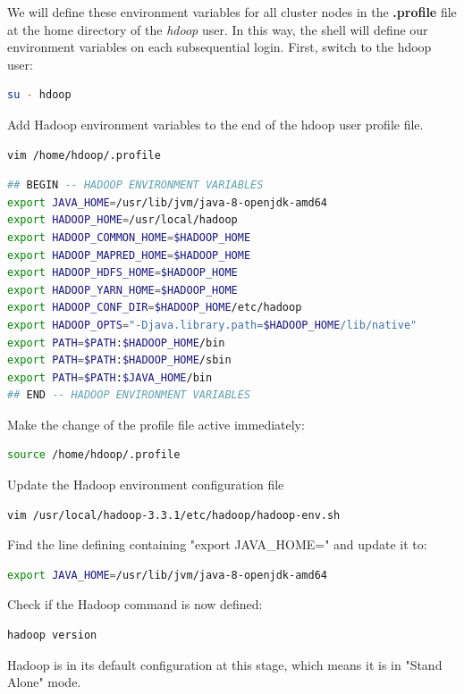 \documentclass[12pt,english]{book}
\begin{document}
We will define these environment variables for all cluster nodes in the \textbf{.profile} file at the home directory of the \textit{hdoop} user. In this way, the shell will define our environment variables on each subsequential login.
First, switch to the hdoop user:
\begin{lstlisting}[language=bash, frame=single, basicstyle=\footnotesize]
su - hdoop
\end{lstlisting}
Add Hadoop environment variables to the end of the hdoop user profile file.
\begin{lstlisting}[language=bash, frame=single, basicstyle=\footnotesize]
vim /home/hdoop/.profile
\end{lstlisting}
\begin{lstlisting}[language=bash, frame=single, basicstyle=\footnotesize]
## BEGIN -- HADOOP ENVIRONMENT VARIABLES
export JAVA_HOME=/usr/lib/jvm/java-8-openjdk-amd64
export HADOOP_HOME=/usr/local/hadoop
export HADOOP_COMMON_HOME=$HADOOP_HOME
export HADOOP_MAPRED_HOME=$HADOOP_HOME
export HADOOP_HDFS_HOME=$HADOOP_HOME
export HADOOP_YARN_HOME=$HADOOP_HOME
export HADOOP_CONF_DIR=$HADOOP_HOME/etc/hadoop
export HADOOP_OPTS="-Djava.library.path=$HADOOP_HOME/lib/native"
export PATH=$PATH:$HADOOP_HOME/bin
export PATH=$PATH:$HADOOP_HOME/sbin
export PATH=$PATH:$JAVA_HOME/bin
## END -- HADOOP ENVIRONMENT VARIABLES
\end{lstlisting}
Make the change of the profile file active immediately:
\begin{lstlisting}[language=bash, frame=single, basicstyle=\footnotesize]
source /home/hdoop/.profile
\end{lstlisting}
Update the Hadoop environment configuration file 
\begin{lstlisting}[language=bash, frame=single, basicstyle=\footnotesize]
vim /usr/local/hadoop-3.3.1/etc/hadoop/hadoop-env.sh
\end{lstlisting}
Find the line defining containing "export JAVA\_HOME=" and update it to:
\begin{lstlisting}[language=bash, frame=single, basicstyle=\footnotesize]
export JAVA_HOME=/usr/lib/jvm/java-8-openjdk-amd64
\end{lstlisting}
Check if the Hadoop command is now defined:
\begin{lstlisting}[language=bash, frame=single, basicstyle=\footnotesize]
hadoop version
\end{lstlisting}
Hadoop is in its default configuration at this stage, which means it is in "Stand Alone" mode.
\end{document}
